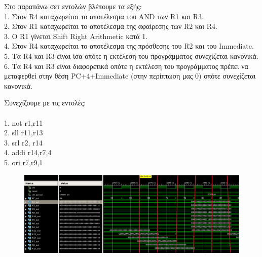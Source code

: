\begin{justify}
    Στο παραπάνω σετ εντολών βλέπουμε τα εξής:\\
    1. Στον \textlatin{R4} καταχωρείται το αποτέλεσμα
    του \textlatin{AND} των \textlatin{R1} και \textlatin{R3}.\\
    2. Στον \textlatin{R1} καταχωρείται το αποτέλεσμα
    της αφαίρεσης των \textlatin{R2} και \textlatin{R4}.\\
    3. Ο \textlatin{R1} γίνεται \textlatin{Shift Right Arithmetic} κατά 1.\\
    4. Στον \textlatin{R4} καταχωρείται το αποτέλεσμα
    της πρόσθεσης του \textlatin{R2} και του \textlatin{Immediate}.\\
    5. Τα \textlatin{R4} και \textlatin{R3} είναι ίσα
    οπότε η εκτέλεση του προγράμματος συνεχίζεται κανονικά.\\
    6. Τα \textlatin{R4} και \textlatin{R3} είναι διαφορετικά
    οπότε η εκτέλεση του προγράμματος πρέπει να μεταφερθεί στην θέση
    \textlatin{PC+4+Immediate} (στην περίπτωση μας 0) οπότε
    συνεχίζεται κανονικά.
\end{justify}

\begin{justify}
    Συνεχίζουμε με τις εντολές:\\\\	 
    \textlatin{1. not r1,r11}\\ 
    \textlatin{2. sll r11,r13}\\
    \textlatin{3. srl r2, r14}\\
    \textlatin{4. addi r14,r7,4}\\
    \textlatin{5. ori r7,r9,1}
\end{justify}

\begin{figure}[h]
    \raggedright
    \hspace{-1cm}
    \includegraphics[width=1.1\textwidth]{Images/Screenshot_5.png} %
\end{figure}

